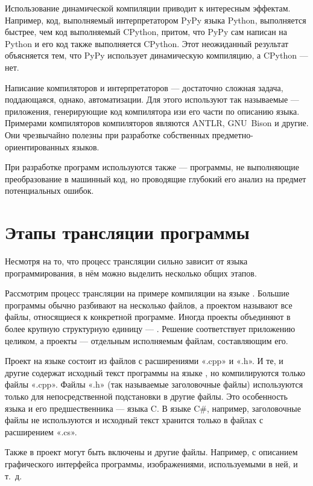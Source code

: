 Использование динамической компиляции приводит к интересным эффектам.
Например, код, выполняемый интерпретатором PyPy языка Python,
выполняется быстрее, чем код выполняемый CPython, притом, что PyPy сам
написан на Python и его код также выполняется CPython. Этот
неожиданный результат объясняется тем, что PyPy использует
динамическую компиляцию, а CPython — нет.

Написание компиляторов и интерпретаторов — достаточно сложная задача,
поддающаяся, однако, автоматизации. Для этого используют так
называемые  —
приложения, генерирующие код компилятора изи его части по описанию
языка. Примерами компиляторов компиляторов являются ANTLR, GNU~Bison и
другие. Они чрезвычайно полезны при разработке собственных
предметно-ориентированных языков.

При разработке программ используются также
 — программы, не
выполняющие преобразование в машинный код, но проводящие глубокий его
анализ на предмет потенциальных ошибок.

\section{Этапы трансляции программы}

Несмотря на то, что процесс трансляции сильно зависит от языка
программирования, в нём можно выделить несколько общих этапов.

Рассмотрим процесс трансляции на примере компиляции
 на языке \CPP. Большие программы обычно
разбивают на несколько файлов, а проектом называют все файлы,
относящиеся к конкретной программе.  Иногда проекты объединяют в более
крупную структурную единицу — .  Решение
соответствует приложению целиком, а проекты — отдельным исполняемым
файлам, составляющим его.

Проект на языке \CPP состоит из файлов с расширениями «.cpp» и «.h».  И
те, и другие содержат исходный текст программы на языке \CPP, но
компилируются только файлы «.cpp». Файлы «.h» (так называемые
заголовочные файлы) используются только для непосредственной
подстановки в другие файлы. Это особенность языка \CPP и его
предшественника — языка C.  В языке C\#, например, заголовочные файлы
не используются и исходный текст хранится только в файлах с
расширением «.cs».

Также в проект могут быть включены и другие файлы. Например, с
описанием графического интерфейса программы, изображениями,
используемыми в ней, и т.~д.

